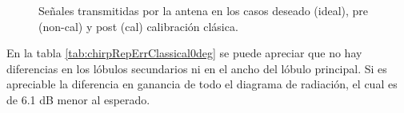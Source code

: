 \begin{figure}[H]
	\centering

	\caption{Señales transmitidas por la antena en los casos deseado (ideal), pre (non-cal) y post (cal) calibración clásica.}
	\label{fig:chirpRepErrClassical0deg}
\end{figure}

En la tabla \ref{tab:chirpRepErrClassical0deg} se puede apreciar que no hay diferencias en los lóbulos secundarios ni en el
ancho del lóbulo principal. Si es apreciable la diferencia en ganancia de todo el diagrama de radiación, el cual es de 6.1 dB
menor al esperado.


